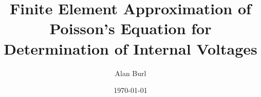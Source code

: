 \documentclass[12pt]{article}
\title{Finite Element Approximation of Poisson's Equation for Determination of Internal Voltages}
\author{Alan Burl}
\date{\today{}}
\begin{document}
\doublespacing
	
%	
\end{document}
